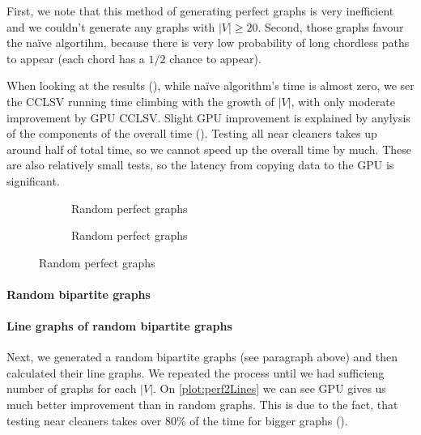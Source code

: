 First, we note that this method of generating perfect graphs is very inefficient and we couldn't generate any graphs with $|V| \geq 20$. Second, those graphs favour the na\"ive algortihm, because there is very low probability of long chordless paths to appear (each chord has a $1/2$ chance to appear).

When looking at the results (), while na\"ive algorithm's time is almost zero, we ser the CCLSV running time climbing with the growth of $|V|$, with only moderate improvement by GPU CCLSV. Slight GPU improvement is explained by anylysis of the components of the overall time (). Testing all near cleaners takes up around half of total time, so we cannot speed up the overall time by much. These are also relatively small tests, so the latency from copying data to the GPU is significant.


\begin{figure}
  \begin{subfigure}{\textwidth}
    \centering
    
    \caption{Random perfect graphs}
    \label{plot:perfLines}
  \end{subfigure}

  \begin{subfigure}{\textwidth}
    \centering
    
    \caption{Random perfect graphs}
    \label{plot:perfDet}
  \end{subfigure}
  \caption{Random perfect graphs}
\end{figure}

\paragraph{Random bipartite graphs}

\paragraph{Line graphs of random bipartite graphs}
Next, we generated a random bipartite graphs (see paragraph above) and then calculated their line graphs. We repeated the process until we had sufficieng number of graphs for each $|V|$. On \cref{plot:perf2Lines} we can see GPU gives us much better improvement than in random graphs. This is due to the fact, that testing near cleaners takes over 80\% of the time for bigger graphs ().

